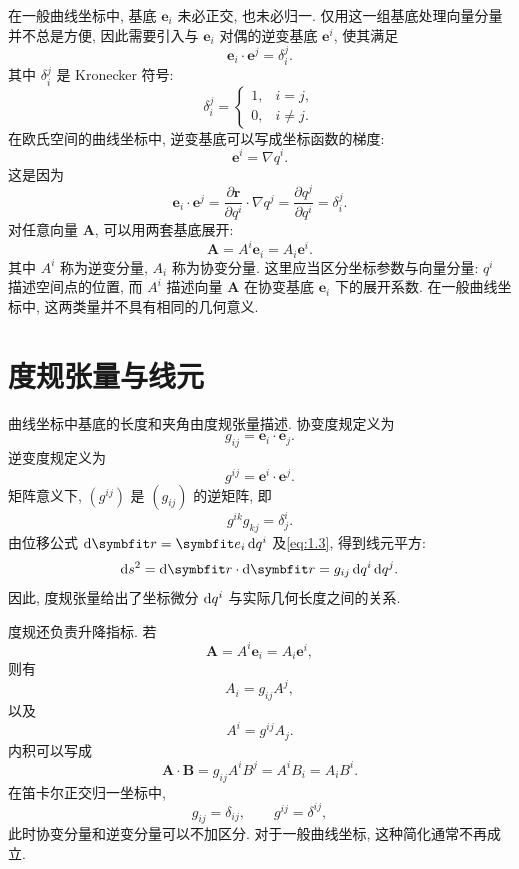 在一般曲线坐标中, 基底 $\bm{e}_{i}$ 未必正交, 也未必归一. 仅用这一组基底处理向量分量并不总是方便, 因此需要引入与 $\bm{e}_{i}$ 对偶的逆变基底 $\bm{e}^{i}$, 使其满足
\begin{equation}
\bm{e}_{i}\cdot \bm{e}^{j}
=
\delta_{i}^{j}. \label{eq:1.2}
\end{equation}
其中 $\delta_{i}^{j}$ 是 Kronecker 符号: 
\[
\delta_{i}^{j}=
\begin{cases}
1,& i=j,\\
0,& i\neq j.
\end{cases}
\]
在欧氏空间的曲线坐标中, 逆变基底可以写成坐标函数的梯度: 
\[
\bm{e}^{i}=\nabla q^{i}.
\]
这是因为
\[
\bm{e}_{i}\cdot \bm{e}^{j}
=
\frac{\partial \bm{r}}{\partial q^{i}}\cdot \nabla q^{j}
=
\frac{\partial q^{j}}{\partial q^{i}}
=
\delta_{i}^{j}.
\]
对任意向量 $\bm{A}$, 可以用两套基底展开: 
\[
\bm{A}
=
A^{i}\bm{e}_{i}
=
A_{i}\bm{e}^{i}.
\]
其中 $A^{i}$ 称为逆变分量, $A_{i}$ 称为协变分量. 这里应当区分坐标参数与向量分量: $q^{i}$ 描述空间点的位置, 而 $A^{i}$ 描述向量 $\bm{A}$ 在协变基底 $\bm{e}_{i}$ 下的展开系数. 在一般曲线坐标中, 这两类量并不具有相同的几何意义. 

\section{度规张量与线元}

曲线坐标中基底的长度和夹角由度规张量描述. 协变度规定义为
\begin{equation}
g_{ij}
=
\bm{e}_{i}\cdot \bm{e}_{j}. \label{eq:1.3}
\end{equation}
逆变度规定义为
\[
g^{ij}
=
\bm{e}^{i}\cdot \bm{e}^{j}.
\]
矩阵意义下, $(g^{ij})$ 是 $(g_{ij})$ 的逆矩阵, 即
\[
g^{ik}g_{kj}
=
\delta^{i}_{j}.
\]
由位移公式 $\dif\bm{r}=\bm{e}_{i} \dif q^{i}$ 及\eqref{eq:1.3}, 得到线元平方: 
\begin{equation}
\dif s^{2}
=
\dif\bm{r}\cdot \dif\bm{r}
=
g_{ij}\dif q^{i} \dif q^{j}. \label{eq:1.4}
\end{equation}
因此, 度规张量给出了坐标微分 $\mathop{}\!\mathrm{d} q^{i}$ 与实际几何长度之间的关系. 

度规还负责升降指标. 若
\[
\bm{A}=A^{i}\bm{e}_{i}=A_{i}\bm{e}^{i},
\]
则有
\[
A_{i}=g_{ij}A^{j},
\]
以及
\[
A^{i}=g^{ij}A_{j}.
\]
内积可以写成
\begin{equation}
\bm{A}\cdot \bm{B}
=
g_{ij}A^{i}B^{j}
=
A^{i}B_{i}
=
A_{i}B^{i}. \label{eq:1.5}
\end{equation}
在笛卡尔正交归一坐标中, 
\[
g_{ij}=\delta_{ij},
\qquad
g^{ij}=\delta^{ij},
\]
此时协变分量和逆变分量可以不加区分. 对于一般曲线坐标, 这种简化通常不再成立. 

